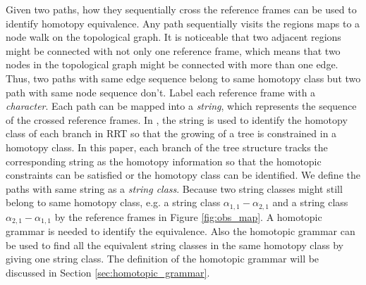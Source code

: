 \documentclass[letterpaper, 10 pt, conference]{ieeeconf}
\begin{document}
Given two paths, how they sequentially cross the reference frames can be used to identify homotopy equivalence.
Any path sequentially visits the regions maps to a node walk on the topological graph.
It is noticeable that two adjacent regions might be connected with not only one reference frame, which means that two nodes in the topological graph might be connected with more than one edge.
Thus, two paths with same edge sequence belong to same homotopy class but two path with same node sequence don't.  
Label each reference frame with a \emph{character}.
Each path can be mapped into a {\em string}, which represents the sequence of the crossed reference frames.
In \cite{Hernandez201544}, the string is used to identify the homotopy class of each branch in RRT so that the growing of a tree is constrained in a homotopy class.
In this paper, each branch of the tree structure tracks the corresponding string as the homotopy information so that the homotopic constraints can be satisfied or the homotopy class can be identified.
We define the paths with same string as a \emph{string class}.
Because two string classes might still belong to same homotopy class, e.g. a string class $ \alpha_{1,1} - \alpha_{2,1} $ and a string class $ \alpha_{2,1} - \alpha_{1,1} $ by the reference frames in Figure \ref{fig:obs_map}.
A homotopic grammar is needed to identify the equivalence.
Also the homotopic grammar can be used to find all the equivalent string classes in the same homotopy class by giving one string class.
The definition of the homotopic grammar will be discussed in Section \ref{sec:homotopic_grammar}.



\end{document}
